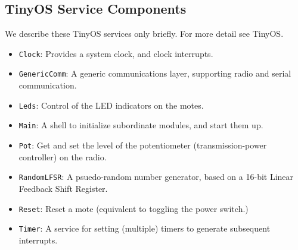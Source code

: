 \documentclass[11pt]{article}
\begin{document}
\subsection{TinyOS Service Components}
We describe these TinyOS services only briefly.  For more detail see
TinyOS.
\begin{itemize}
\item {\tt Clock}: Provides a system clock, and clock interrupts.
\item {\tt GenericComm}: A generic communications layer, supporting
  radio and serial communication.
\item {\tt Leds}: Control of the LED indicators on the motes.
\item {\tt Main}: A shell to initialize subordinate modules, and start
  them up.
\item {\tt Pot}: Get and set the level of the potentiometer
  (transmission-power controller) on the radio.
\item {\tt RandomLFSR}: A psuedo-random number generator, based on a
  16-bit Linear Feedback Shift Register.
\item {\tt Reset}:  Reset a mote (equivalent to toggling the 
power switch.)
\item {\tt Timer}: A service for setting (multiple) timers to generate
  subsequent interrupts.
\end{itemize}
\end{document}

